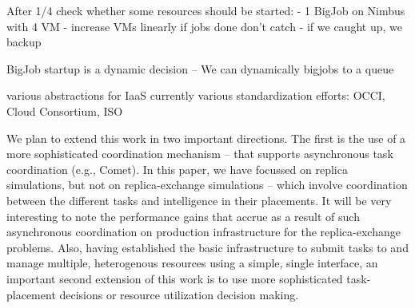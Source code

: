 \documentclass[conference,final]{IEEEtran}
\begin{document}
After 1/4 check whether some resources should be started:
- 1 BigJob on Nimbus with 4 VM
- increase VMs linearly if jobs done don't catch
- if we caught up, we backup

BigJob startup is a dynamic decision -- We can dynamically bigjobs to a queue









various abstractions for IaaS currently
various standardization efforts: OCCI, Cloud Consortium, ISO

We plan to extend this work in two important directions. The first is
the use of a more sophisticated coordination mechanism -- that
supports asynchronous task coordination (e.g., Comet). In this paper,
we have focussed on replica simulations, but not on replica-exchange
simulations -- which involve coordination between the different tasks
and intelligence in their placements.  It will be very interesting to
note the performance gains that accrue as a result of such
asynchronous coordination on production infrastructure for the
replica-exchange problems. Also, having established the basic
infrastructure to submit tasks to and manage multiple, heterogenous
resources using a simple, single interface, an important second
extension of this work is to use more sophisticated task-placement
decisions or resource utilization decision making.



\end{document}
